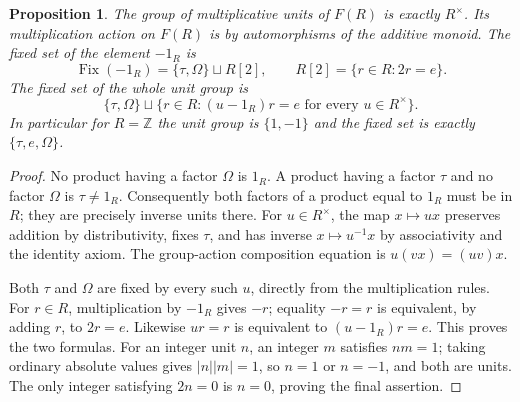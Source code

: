 \documentclass[11pt]{article}
\newtheorem{proposition}[theorem]{Proposition}
\theoremstyle{definition}
\newcommand{\Om}{\Omega}
\newcommand{\Fix}{\operatorname{Fix}}
\begin{document}
\begin{proposition}\label{prop:unitsfixed}
The group of multiplicative units of \(F(R)\) is exactly \(R^\times\).
Its multiplication action on \(F(R)\) is by automorphisms of the
additive monoid. The fixed set of the element \(-1_R\) is
\[
 \Fix(-1_R)=\{\tau,\Om\}\sqcup R[2],\qquad
 R[2]=\{r\in R:2r=e\}.
\tag{12}\label{eq:signfixed}
\]
The fixed set of the whole unit group is
\[
 \{\tau,\Om\}\sqcup
 \{r\in R:(u-1_R)r=e\text{ for every }u\in R^\times\}.
\tag{13}\label{eq:allfixed}
\]
In particular for \(R=\mathbb Z\) the unit group is \(\{1,-1\}\)
and the fixed set is exactly \(\{\tau,e,\Om\}\).
\end{proposition}
\begin{proof}
No product having a factor \(\Om\) is \(1_R\). A product having a
factor \(\tau\) and no factor \(\Om\) is \(\tau\ne1_R\).
Consequently both factors of a product equal to \(1_R\) must be in
\(R\); they are precisely inverse units there. For \(u\in R^\times\),
the map \(x\mapsto ux\) preserves addition by distributivity, fixes
\(\tau\), and has inverse \(x\mapsto u^{-1}x\) by associativity
and the identity axiom. The group-action composition equation is
\(u(vx)=(uv)x\).

Both \(\tau\) and \(\Om\) are fixed by every such \(u\), directly
from the multiplication rules. For \(r\in R\), multiplication by
\(-1_R\) gives \(-r\); equality \(-r=r\) is equivalent, by adding
\(r\), to \(2r=e\). Likewise \(ur=r\) is equivalent to
\((u-1_R)r=e\). This proves the two formulas.
For an integer unit \(n\), an integer \(m\) satisfies \(nm=1\);
taking ordinary absolute values gives \(|n||m|=1\), so \(n=1\) or
\(n=-1\), and both are units. The only integer satisfying \(2n=0\)
is \(n=0\), proving the final assertion.
\end{proof}
\end{document}

